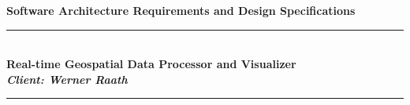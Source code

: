 \documentclass[a4paper,12pt]{article}
\begin{document}
	
\begin{titlepage}
	\newcommand{\HRule}{\rule{\linewidth}{0.5mm}} %

	\center %
	 
	

	
	{ \huge \bfseries Software Architecture Requirements and Design Specifications}\\\HRule \\[0.4cm] %
	\Large\textbf{Real-time Geospatial Data Processor and Visualizer} \\
	\small \emph{\textbf{Client: Werner Raath}}
	\HRule \\[1.5cm]
	 

\end{titlepage}
\end{document}
